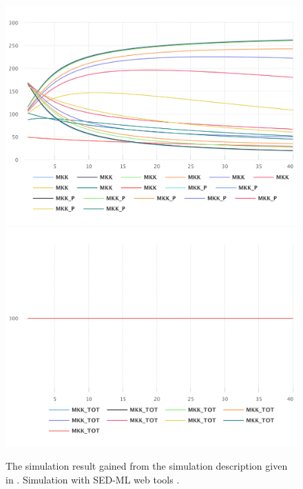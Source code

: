 \begin{figure}[ht]
    \centering
    \begin{minipage}{0.47\textwidth}
        \centering
        \includegraphics[width=1.0\textwidth]{examples/parameter-scan-2d/results/sedml_webtools/plot1}
        \includegraphics[width=1.0\textwidth]{examples/parameter-scan-2d/results/sedml_webtools/plot2}
        \caption{The simulation result gained from the simulation description given in . Simulation with SED-ML web tools \citep{bergmann2017sed}.}
    \end{minipage}\hfill
    \begin{minipage}{0.47\textwidth}
        \centering

\end{minipage}
\end{figure}
